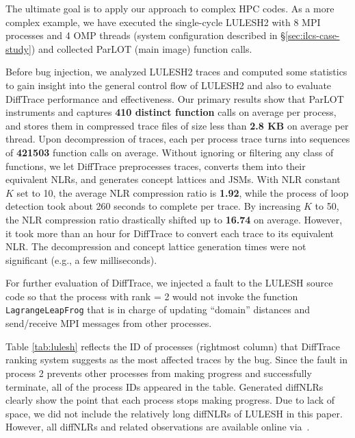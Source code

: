 

The ultimate goal is to apply our approach to complex HPC codes.
%
As a more complex example, we have executed the single-cycle LULESH2\cite{LULESH2:changes} with 8 MPI processes and 4 OMP threads (system configuration described in \S\ref{sec:ilcs-case-study}) and collected ParLOT (main image) function calls.
%

Before bug injection, we analyzed LULESH2 traces and computed some statistics to gain insight into the general control flow of LULESH2 and also to evaluate DiffTrace performance and effectiveness. Our primary results show that ParLOT instruments and captures \textbf{410 distinct function} calls on average per process, and stores them in compressed trace files of size less than \textbf{2.8 KB} on average per thread.
%
Upon decompression of traces, each per process trace turns into sequences of \textbf{421503} function calls on average.
%
Without ignoring or filtering any class of functions, we let DiffTrace preprocesses traces, converts them into their equivalent NLRs, and generates concept lattices and JSMs. 
%
With NLR constant $K$ set to 10, the average NLR compression ratio is \textbf{1.92}, while the process of loop detection took about 260 seconds to complete per trace.
%
By increasing $K$ to 50, the NLR compression ratio drastically shifted up to \textbf{16.74} on average. However, it took more than an hour for DiffTrace to convert each trace to its equivalent NLR. 
%
The decompression and concept lattice generation times were not significant (e.g., a few milliseconds).
%

For further evaluation of DiffTrace, we injected a fault to the LULESH source code so that the process with rank = 2 would not invoke the function \texttt{LagrangeLeapFrog} that is in charge of updating ``domain'' distances and send/receive MPI messages from other processes.
%

%
Table \ref{tab:lulesh} reflects the ID of processes (rightmost column) that DiffTrace ranking system suggests as the most affected traces by the bug.
%
Since the fault in process 2 prevents other processes from making progress and successfully terminate, all of the process IDs appeared in the table. Generated diffNLRs clearly show the point that each process stops making progress. Due to lack of space, we did not include the relatively long diffNLRs of LULESH in this paper. However, all diffNLRs and related observations are available online via~\cite{diffTraceMaterials}.


